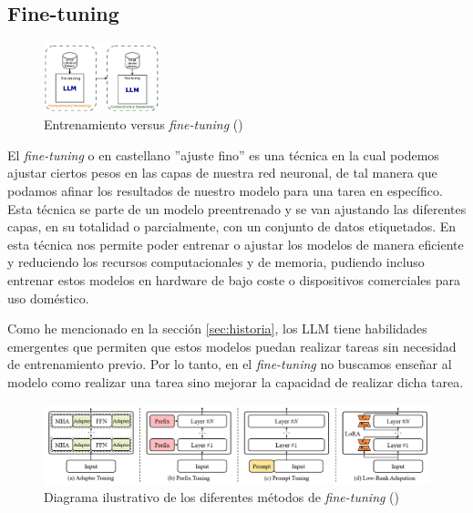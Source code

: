 \subsection{Fine-tuning}
\label{subsec:fine_tuning}


\begin{figure}
    \centering
    \includegraphics[width=0.3\textwidth]{figuras/Capitulo_03/TrainVSFinetuning.png}
    \caption[Entrenamiento versus \textit{fine-tuning}]{Entrenamiento versus \textit{fine-tuning} (\cite{SupervisedFineTuning})}
    \label{fig:finetuningVStraining}
\end{figure}

El \textit{fine-tuning} o en castellano ''ajuste fino'' es una técnica en la cual podemos ajustar
ciertos pesos en las capas de nuestra red neuronal, de tal manera que podamos afinar los
resultados de nuestro modelo para una tarea en específico. Esta técnica se parte de un
modelo preentrenado y se van ajustando las diferentes capas, en su totalidad o parcialmente,
con un conjunto de datos etiquetados. En esta técnica nos permite poder entrenar o ajustar los
modelos de manera eficiente y reduciendo los recursos computacionales y de memoria, pudiendo
incluso entrenar estos modelos en hardware de bajo coste o dispositivos comerciales para
uso doméstico.

Como he mencionado en la sección \ref{sec:historia}, los LLM tiene habilidades emergentes
que permiten que estos modelos puedan realizar tareas sin necesidad de entrenamiento previo.
Por lo tanto, en el \textit{fine-tuning} no buscamos enseñar al modelo como realizar una tarea sino
mejorar la capacidad de realizar dicha tarea. \cite{Finetuning}

\begin{figure}[H]
    \begin{center}
      \includegraphics[width=15cm]{figuras/Capitulo_03/Finetuning.png}
    \end{center}
    \caption[Diagrama ilustrativo de los diferentes métodos de \textit{fine-tuning}]{Diagrama ilustrativo de los diferentes métodos de \textit{fine-tuning} (\cite{Finetuning})}
    \label{fig:finetuning}
\end{figure}

